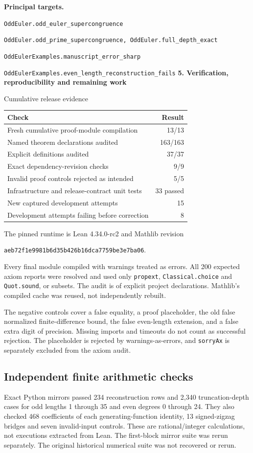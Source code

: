 \documentclass[11pt]{article}
\newcommand{\target}[1]{{\footnotesize\texttt{#1}}}
\newcommand{\pageheading}[2]{{\Large\bfseries\color{ink}#1}\par{\small #2}\par\medskip}
\begin{document}
\textbf{Principal targets.}\par
\target{OddEuler.odd\_euler\_supercongruence}\par
\target{OddEuler.odd\_prime\_supercongruence, OddEuler.full\_depth\_exact}\par
\target{OddEulerExamples.manuscript\_error\_sharp}\par
\target{OddEulerExamples.even\_length\_reconstruction\_fails}
\newpage
\pageheading{5. Verification, reproducibility and remaining work}{Cumulative release evidence}
\begin{center}
\begin{tabular}{@{}p{}r@{}}
\toprule
Check & Result\\\midrule
Fresh cumulative proof-module compilation & 13/13\\
Named theorem declarations audited & 163/163\\
Explicit definitions audited & 37/37\\
Exact dependency-revision checks & 9/9\\
Invalid proof controls rejected as intended & 5/5\\
Infrastructure and release-contract unit tests & 33 passed\\
New captured development attempts & 15\\
Development attempts failing before correction & 8\\\bottomrule
\end{tabular}
\end{center}
The pinned runtime is Lean 4.34.0-rc2 and Mathlib revision
\begin{center}\footnotesize\texttt{aeb72f1e9981b6d35b426b16dca7759be3e7ba06}.\end{center}
Every final module compiled with warnings treated as errors. All 200 expected axiom reports were resolved and used only \texttt{propext}, \texttt{Classical.choice} and \texttt{Quot.sound}, or subsets. The audit is of explicit project declarations. Mathlib's compiled cache was reused, not independently rebuilt.

The negative controls cover a false equality, a proof placeholder, the old false normalized finite-difference bound, the false even-length extension, and a false extra digit of precision. Missing imports and timeouts do not count as successful rejection. The placeholder is rejected by warnings-as-errors, and \texttt{sorryAx} is separately excluded from the axiom audit.

\subsection*{Independent finite arithmetic checks}
Exact Python mirrors passed 234 reconstruction rows and 2,340 truncation-depth cases for odd lengths 1 through 35 and even degrees 0 through 24. They also checked 468 coefficients of each generating-function identity, 13 signed-zigzag bridges and seven invalid-input controls. These are rational/integer calculations, not executions extracted from Lean. The first-block mirror suite was rerun separately. The original historical numerical suite was not recovered or rerun.
\end{document}
